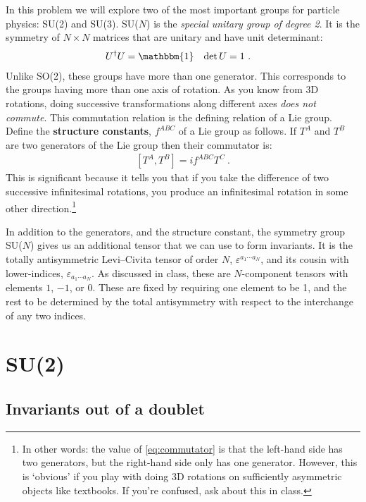 \documentclass[12pt]{article}
\numberwithin{equation}{section}    %
\begin{document}
In this problem we will explore two of the most important groups for particle physics: SU(2) and SU(3). 
%
SU($N$) is the \emph{special unitary group of degree 2}. It is the symmetry of $N\times N$ matrices that are unitary and have unit determinant:
\begin{align}
	U^\dag U &= \mathbbm{1} 
	&
	\det U &= 1 \ .
\end{align}
Unlike SO(2), these groups have more than one generator. This corresponds to the groups having more than one axis of rotation. As you know from 3D rotations, doing successive transformations along different axes \emph{does not commute}. This commutation relation is the defining relation of a Lie group. Define the \textbf{structure constants}, $f^{ABC}$ of a Lie group as follows. If $T^A$ and $T^B$ are two generators of the Lie group then their commutator is:
\begin{align}
	\left[T^A, T^B\right] = i f^{ABC}T^C \ .
	\label{eq:commutator}
\end{align}
This is significant because it tells you that if you take the difference of two successive infinitesimal rotations, you produce an infinitesimal rotation in some other direction.\footnote{In other words: the value of \eqref{eq:commutator} is that the left-hand side has two generators, but the right-hand side only has one generator. However, this is `obvious' if you play with doing 3D rotations on sufficiently asymmetric objects like textbooks. If you're confused, ask about this in class.}

In addition to the generators, and the structure constant, the symmetry group SU($N$) gives us an additional tensor that we can use to form invariants. It is the totally antisymmetric Levi--Civita tensor of order $N$, $\varepsilon^{a_1\cdots a_N}$, and its cousin with lower-indices, $\varepsilon_{a_1\cdots a_N}$. As discussed in class, these are $N$-component tensors with elements $1$, $-1$, or $0$. These are fixed by requiring one element to be 1, and the rest to be determined by the total antisymmetry with respect to the interchange of any two indices. 


\section{SU(2)}

\subsection{Invariants out of a doublet}
\end{document}
